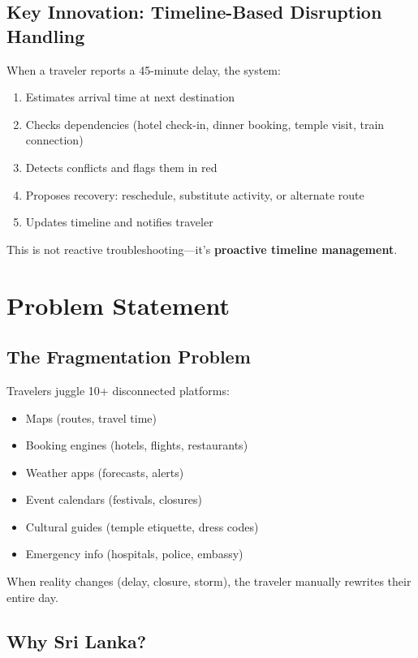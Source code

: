 \documentclass[11pt]{article}
\begin{document}
\subsection{Key Innovation: Timeline-Based Disruption Handling}

When a traveler reports a 45-minute delay, the system:
\begin{enumerate}
    \item Estimates arrival time at next destination
    \item Checks dependencies (hotel check-in, dinner booking, temple visit, train connection)
    \item Detects conflicts and flags them in red
    \item Proposes recovery: reschedule, substitute activity, or alternate route
    \item Updates timeline and notifies traveler
\end{enumerate}

This is not reactive troubleshooting—it's \textbf{proactive timeline management}.

\section{Problem Statement}

\subsection{The Fragmentation Problem}

Travelers juggle 10+ disconnected platforms:
\begin{itemize}
    \item Maps (routes, travel time)
    \item Booking engines (hotels, flights, restaurants)
    \item Weather apps (forecasts, alerts)
    \item Event calendars (festivals, closures)
    \item Cultural guides (temple etiquette, dress codes)
    \item Emergency info (hospitals, police, embassy)
\end{itemize}

When reality changes (delay, closure, storm), the traveler manually rewrites their entire day.

\subsection{Why Sri Lanka?}
\end{document}
